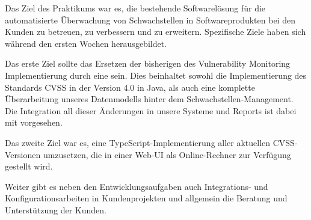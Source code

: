 Das Ziel des Praktikums war es, die bestehende Softwarelösung für die automatisierte Überwachung von Schwachstellen in Softwareprodukten bei den Kunden zu betreuen, zu verbessern und zu erweitern.
Spezifische Ziele haben sich während den ersten Wochen herausgebildet.

Das erste Ziel sollte das Ersetzen der bisherigen  des Vulnerability Monitoring Implementierung durch eine  sein.
Dies beinhaltet sowohl die Implementierung des Standards CVSS in der Version 4.0 in Java, als auch eine komplette Überarbeitung unseres Datenmodells hinter dem Schwachstellen-Management.
Die Integration all dieser Änderungen in unsere Systeme und Reports ist dabei mit vorgesehen.

Das zweite Ziel war es, eine TypeScript-Implementierung aller aktuellen CVSS-Versionen umzusetzen, die in einer Web-UI als Online-Rechner zur Verfügung gestellt wird.

Weiter gibt es neben den Entwicklungsaufgaben auch Integrations- und Konfigurationsarbeiten in Kundenprojekten und allgemein die Beratung und Unterstützung der Kunden.
